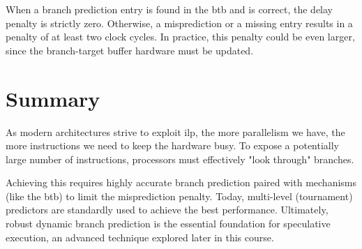 When a branch prediction entry is found in the \gls{btb} and is correct, the delay penalty is strictly zero. Otherwise, a misprediction or a missing entry results in a penalty of at least two clock cycles. In practice, this penalty could be even larger, since the branch-target buffer hardware must be updated.

\section{Summary}

As modern architectures strive to exploit \gls{ilp}, the more parallelism we have, the more instructions we need to keep the hardware busy. To expose a potentially large number of instructions, processors must effectively "look through" branches. 

Achieving this requires highly accurate branch prediction paired with mechanisms (like the \gls{btb}) to limit the misprediction penalty. Today, multi-level (tournament) predictors are standardly used to achieve the best performance. Ultimately, robust dynamic branch prediction is the essential foundation for speculative execution, an advanced technique explored later in this course.